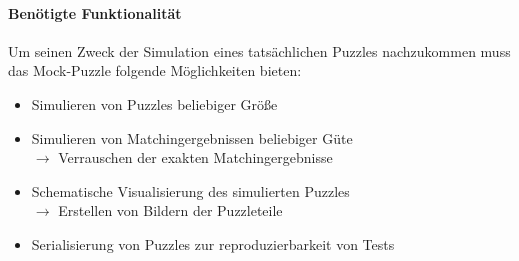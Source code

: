 \paragraph{Benötigte Funktionalität}
Um seinen Zweck der Simulation eines tatsächlichen Puzzles nachzukommen muss das Mock-Puzzle folgende Möglichkeiten bieten:
\begin{itemize}
    \item Simulieren von Puzzles beliebiger Größe
    \item Simulieren von Matchingergebnissen beliebiger Güte\\
        $\rightarrow$ Verrauschen der exakten Matchingergebnisse
    \item Schematische Visualisierung des simulierten Puzzles\\
        $\rightarrow$ Erstellen von Bildern der Puzzleteile
    \item Serialisierung von Puzzles zur reproduzierbarkeit von Tests

\end{itemize}

